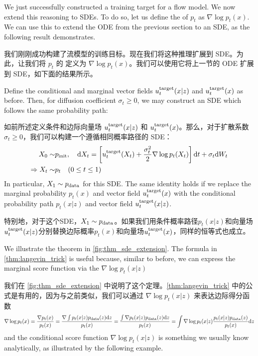 We just successfully constructed a training target for a flow model. We now extend this reasoning to SDEs. To do so, let us define the  of $p_t$ as $\nabla\log p_t(x)$. We can use this to extend the ODE from the previous section to an SDE, as the following result demonstrates.

我们刚刚成功构建了流模型的训练目标。现在我们将这种推理扩展到 SDE。为此，让我们将 $p_t$ 的  定义为 $\nabla\log p_t(x)$。我们可以使用它将上一节的 ODE 扩展到 SDE，如下面的结果所示。
\begin{theorem}
\label{thm:langevin_trick}
Define the conditional and marginal vector fields $u^{\text{target}}_t(x|z)$ and $u^{\text{target}}_t(x)$ as before. Then, for diffusion coefficient $\sigma_t\geq 0$, we may construct an SDE which follows the same probability path:

如前所述定义条件和边际向量场 $u^{\text{target}}_t(x|z)$ 和 $u^{\text{target}}_t(x)$。那么，对于扩散系数 $\sigma_t\geq 0$，我们可以构建一个遵循相同概率路径的 SDE：
\begin{align}
\label{eq:sde_extension}
    X_0\sim&p_{\rm{init}},\quad \mathrm{d} X_t =\left[u^{\text{target}}_t(X_t)+\frac{\sigma_t^2}{2}\nabla\log p_t(X_t)\right]\mathrm{d} t +\sigma_t\mathrm{d} W_t\\
    \label{eq:marginal_ode_follows_marginal_path_sde}
    \Rightarrow X_t\sim& p_t\quad (0\leq t\leq 1)
\end{align}
In particular, $X_1\sim p_{\rm{data}}$ for this SDE. The same identity holds if we replace the marginal probability $p_t(x)$ and vector field $u^{\text{target}}_t(x)$ with the conditional probability path $p_t(x|z)$ and vector field $u^{\text{target}}_t(x|z)$.

特别地，对于这个SDE，$X_1\sim p_{\rm{data}}$。如果我们用条件概率路径$p_t(x|z)$和向量场$u^{\text{target}}_t(x|z)$分别替换边际概率$p_t(x)$和向量场$u^{\text{target}}_t(x)$，同样的恒等式也成立。
\end{theorem}
We illustrate the theorem in \cref{fig:thm_sde_extension}. The formula in \cref{thm:langevin_trick} is useful because, similar to before, we can express the marginal score function via the  $\nabla\log p_t(x|z)$

我们在 \cref{fig:thm_sde_extension} 中说明了这个定理。\cref{thm:langevin_trick} 中的公式是有用的，因为与之前类似，我们可以通过  $\nabla\log p_t(x|z)$ 来表达边际得分函数
\begin{align}
\label{e:marginal_score}
\nabla\log p_t(x) = \frac{\nabla p_t(x)}{p_t(x)}
=\frac{\nabla \int p_t(x|z)p_{\rm{data}}(z)\mathrm{d} z}{p_t(x)}
=\frac{\int \nabla p_t(x|z)p_{\rm{data}}(z)\mathrm{d} z}{p_t(x)}
=\int \nabla \log p_t(x|z)\frac{ p_t(x|z)p_{\rm{data}}(z)}{p_t(x)}\mathrm{d} z
\end{align}
and the conditional score function $\nabla \log p_t(x|z)$ is something we usually know analytically, as illustrated by the following example.


